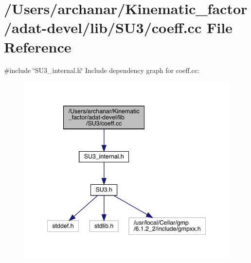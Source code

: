 \hypertarget{adat-devel_2lib_2SU3_2coeff_8cc}{}\section{/\+Users/archanar/\+Kinematic\+\_\+factor/adat-\/devel/lib/\+S\+U3/coeff.cc File Reference}
\label{adat-devel_2lib_2SU3_2coeff_8cc}
{\ttfamily \#include \char`\"{}S\+U3\+\_\+internal.\+h\char`\"{}}\newline
Include dependency graph for coeff.\+cc\+:
\nopagebreak
\begin{figure}[H]
\begin{center}
\leavevmode
\includegraphics[width=342pt]{d9/d1c/adat-devel_2lib_2SU3_2coeff_8cc__incl}
\end{center}
\end{figure}
